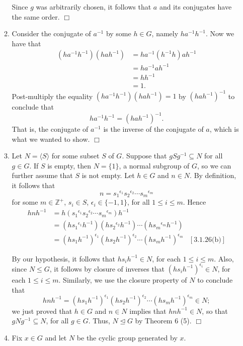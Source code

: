 \documentclass[9pt]{article}
\newcommand{\qed}{\hfill \ensuremath{\Box}}
\newcommand{\cyc}[1]{\langle #1 \rangle}
\newcommand{\Z}{\mathbb{Z}}
\begin{document}
\begin{enumerate}
\begin{enumerate}
            Since $g$ was arbitrarily chosen, it follows that $a$ and its
            conjugates have the same order. \qed
      \item Consider the conjugate of $a^{-1}$ by some $h \in G$, namely
            $ha^{-1}h^{-1}$. Now we have that
            \begin{align*}
               (ha^{-1}h^{-1})(hah^{-1}) &= ha^{-1}(h^{-1}h)ah^{-1} \\
                  &= ha^{-1}ah^{-1} \\
                  &= hh^{-1} \\
                  &= 1.
            \end{align*}
            Post-multiply the equality $(ha^{-1}h^{-1})(hah^{-1}) = 1$ by
            $(hah^{-1})^{-1}$ to conclude that
            $$ha^{-1}h^{-1} = (hah^{-1})^{-1}.$$
            That is, the conjugate of $a^{-1}$ is the inverse of the conjugate 
            of $a$, which is what we wanted to show. \qed
      \item Let $N = \cyc{S}$ for some subset $S$ of $G$. Suppose that
            $gSg^{-1} \subseteq N$ for all $g \in G$. If $S$ is empty, then
            $N = \{1\}$, a normal subgroup of $G$, so we can further assume that
            $S$ is not empty. Let $h \in G$ and $n \in N$. By definition, it
            follows that
            $$n = {s_1}^{\epsilon_1}{s_2}^{\epsilon_2}\cdots{s_m}^{\epsilon_m}$$
            for some $m \in \Z^+$, $s_i \in S$, $\epsilon_i \in \{-1, 1\}$,
            for all $1 \le i \le m$. Hence
            \begin{align*}
               hnh^{-1} &= h({s_1}^{\epsilon_1}{s_2}^{\epsilon_2}
                  \cdots{s_m}^{\epsilon_m})h^{-1} \\
                  &= (h{s_1}^{\epsilon_1}h^{-1})(h{s_2}^{\epsilon_2}h^{-1})
                  \cdots(h{s_m}^{\epsilon_m}h^{-1}) \\
                  &= (hs_1h^{-1})^{\epsilon_1}(hs_2h^{-1})^{\epsilon_2}
                  \cdots(hs_mh^{-1})^{\epsilon_m} &[3.1.26\text{(b)}]
            \end{align*}

            By our hypothesis, it follows that $hs_ih^{-1} \in N$, for each
            $1 \le i \le m$. Also, since $N \le G$, it follows by closure of
            inverses that $(hs_ih^{-1})^{\epsilon_i} \in N$, for each
            $1 \le i \le m$. Similarly, we use the closure property of $N$ to
            conclude that
            $$hnh^{-1} = (hs_1h^{-1})^{\epsilon_1}(hs_2h^{-1})^{\epsilon_2}
              \cdots(hs_mh^{-1})^{\epsilon_m} \in N;$$
            we just proved that $h \in G$ and $n \in N$ implies that
            $hnh^{-1} \in N$, so that $gNg^{-1} \subseteq N$, for all $g \in G$.
            Thus, $N \trianglelefteq G$ by Theorem 6 (5). \qed
      \item Fix $x \in G$ and let $N$ be the cyclic group generated by $x$.


\end{enumerate}
\end{enumerate}
\end{document}
